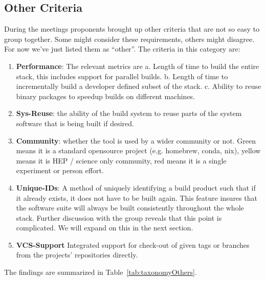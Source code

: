 \documentclass[12pt,a4paper]{article}
\begin{document}
\subsection{Other Criteria}
During the meetings proponents brought up other criteria that are not so easy to group together.  Some might consider these requirements, others might disagree. For now we've just listed them as ``other''. The criteria in this category are:
\begin{enumerate}
\item \textbf{Performance}: The relevant metrics are a. Length of time to build
the entire stack, this includes support for parallel builds. b. Length of time
to incrementally build a developer defined subset of the stack. c. Ability to
reuse binary packages to speedup builds on different machines.
\item \textbf{Sys-Reuse}: the ability of the build system to reuse parts of the system software that is being built if desired.
\item \textbf{Community}: whether the tool is used by a wider community or not. Green means it is a standard opensource project (e.g. homebrew, conda, nix), yellow means it is HEP / science only community, red means it is a single experiment or person effort.
\item \textbf{Unique-IDs}: A method of uniquely identifying a build product such that if it already exists, it does not have to be built again. This feature insures that the software suite will always be built consistently throughout the whole stack. Further discussion with the group reveals that this point is complicated. We will expand on this in the next section.
  \item \textbf{VCS-Support} Integrated support for check-out of given tags or branches from the projects’ repositories directly.
\end{enumerate}
The findings are summarized in Table~\ref{tab:taxonomyOthers}.
\end{document}
